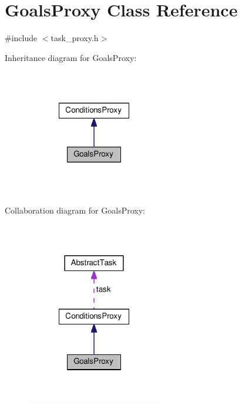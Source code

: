 \hypertarget{classGoalsProxy}{\section{Goals\-Proxy Class Reference}
\label{classGoalsProxy}
}


{\ttfamily \#include $<$task\-\_\-proxy.\-h$>$}



Inheritance diagram for Goals\-Proxy\-:
\nopagebreak
\begin{figure}[H]
\begin{center}
\leavevmode
\includegraphics[width=168pt]{classGoalsProxy__inherit__graph}
\end{center}
\end{figure}


Collaboration diagram for Goals\-Proxy\-:
\nopagebreak
\begin{figure}[H]
\begin{center}
\leavevmode
\includegraphics[width=168pt]{classGoalsProxy__coll__graph}
\end{center}
\end{figure}
